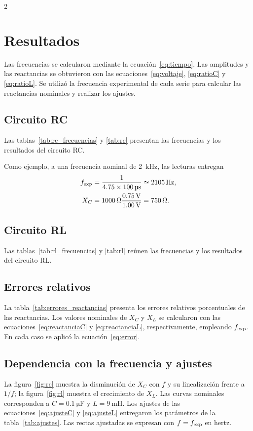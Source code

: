 \documentclass[10pt,letterpaper]{article}
\begin{document}
\clearpage
\begin{multicols}{2}\raggedcolumns
\section{Resultados}
Las frecuencias se calcularon mediante la ecuación~\eqref{eq:tiempo}. Las amplitudes y las reactancias se obtuvieron con las ecuaciones~\eqref{eq:voltaje}, \eqref{eq:ratioC} y \eqref{eq:ratioL}. Se utilizó la frecuencia experimental de cada serie para calcular las reactancias nominales y realizar los ajustes.

\subsection{Circuito RC}
Las tablas~\ref{tab:rc_frecuencias} y \ref{tab:rc} presentan las frecuencias y los resultados del circuito RC.



Como ejemplo, a una frecuencia nominal de \SI{2}{\kilo\hertz}, las lecturas entregan
\begin{align}
 f_{\rm exp}&=\frac{1}{\num{4.75}\times\SI{100}{\micro\second}}\simeq\SI{2105}{\hertz},\\
 X_C&=\SI{1000}{\ohm}\frac{\SI{0.75}{\volt}}{\SI{1.00}{\volt}}=\SI{750}{\ohm}.
\end{align}

\columnbreak
\subsection{Circuito RL}
Las tablas~\ref{tab:rl_frecuencias} y \ref{tab:rl} reúnen las frecuencias y los resultados del circuito RL.



\subsection{Errores relativos}
La tabla~\ref{tab:errores_reactancias} presenta los errores relativos porcentuales de las reactancias. Los valores nominales de $X_C$ y $X_L$ se calcularon con las ecuaciones~\eqref{eq:reactanciaC} y \eqref{eq:reactanciaL}, respectivamente, empleando $f_{\rm exp}$. En cada caso se aplicó la ecuación~\eqref{eq:error}.

\end{multicols}

\clearpage
\subsection{Dependencia con la frecuencia y ajustes}
La figura~\ref{fig:rc} muestra la disminución de $X_C$ con $f$ y su linealización frente a $1/f$; la figura~\ref{fig:rl} muestra el crecimiento de $X_L$. Las curvas nominales corresponden a $C=\SI{0.1}{\micro\farad}$ y $L=\SI{9}{\milli\henry}$. Los ajustes de las ecuaciones~\eqref{eq:ajusteC} y \eqref{eq:ajusteL} entregaron los parámetros de la tabla~\ref{tab:ajustes}. Las rectas ajustadas se expresan con $f=f_{\rm exp}$ en hertz.
\end{document}
